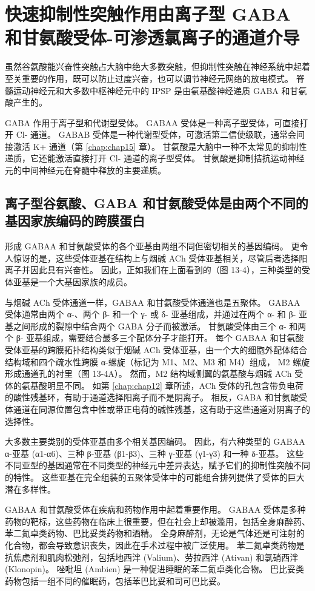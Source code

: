 \section{快速抑制性突触作用由离子型 GABA 和甘氨酸受体-可渗透氯离子的通道介导}

虽然谷氨酸能兴奋性突触占大脑中绝大多数突触，但抑制性突触在神经系统中起着至关重要的作用，既可以防止过度兴奋，也可以调节神经元网络的放电模式。
脊髓运动神经元和大多数中枢神经元中的 IPSP 是由氨基酸神经递质 GABA 和甘氨酸产生的。


GABA 作用于离子型和代谢型受体。 GABAA 受体是一种离子型受体，可直接打开 Cl- 通道。 
GABAB 受体是一种代谢型受体，可激活第二信使级联，通常会间接激活 K+ 通道（第 \ref{chap:chap15} 章）。 
甘氨酸是大脑中一种不太常见的抑制性递质，它还能激活直接打开 Cl- 通道的离子型受体。 
甘氨酸是抑制拮抗运动神经元的中间神经元在脊髓中释放的主要递质。


\subsection{离子型谷氨酸、GABA 和甘氨酸受体是由两个不同的基因家族编码的跨膜蛋白}
形成 GABAA 和甘氨酸受体的各个亚基由两组不同但密切相关的基因编码。 
更令人惊讶的是，这些受体亚基在结构上与烟碱 ACh 受体亚基相关，尽管后者选择阳离子并因此具有兴奋性。 
因此，正如我们在上面看到的（图 13-4），三种类型的受体亚基是一个大基因家族的成员。


与烟碱 ACh 受体通道一样，GABAA 和甘氨酸受体通道也是五聚体。
GABAA 受体通常由两个 α-、两个 β- 和一个 γ- 或 δ- 亚基组成，并通过在两个 α- 和 β- 亚基之间形成的裂隙中结合两个 GABA 分子而被激活。 甘氨酸受体由三个 α- 和两个 β- 亚基组成，需要结合最多三个配体分子才能打开。 
每个 GABAA 和甘氨酸受体亚基的跨膜拓扑结构类似于烟碱 ACh 受体亚基，由一个大的细胞外配体结合结构域和四个疏水性跨膜 α-螺旋（标记为 M1、M2、M3 和 M4）组成， M2 螺旋形成通道孔的衬里（图 13-4A）。 
然而，M2 结构域侧翼的氨基酸与烟碱 ACh 受体的氨基酸明显不同。 
如第 \ref{chap:chap12} 章所述，ACh 受体的孔包含带负电荷的酸性残基环，有助于通道选择阳离子而不是阴离子。 
相反，GABA 和甘氨酸受体通道在同源位置包含中性或带正电荷的碱性残基，这有助于这些通道对阴离子的选择性。


大多数主要类别的受体亚基由多个相关基因编码。 
因此，有六种类型的 GABAA α-亚基 (α1-α6)、三种 β-亚基 (β1-β3)、三种 γ-亚基 (γ1-γ3) 和一种 δ-亚基。 
这些不同亚型的基因通常在不同类型的神经元中差异表达，赋予它们的抑制性突触不同的特性。 
这些亚基在完全组装的五聚体受体中的可能组合排列提供了受体的巨大潜在多样性。


GABAA 和甘氨酸受体在疾病和药物作用中起着重要作用。 
GABAA 受体是多种药物的靶标，这些药物在临床上很重要，但在社会上却被滥用，包括全身麻醉药、苯二氮卓类药物、巴比妥类药物和酒精。 
全身麻醉剂，无论是气体还是可注射的化合物，都会导致意识丧失，因此在手术过程中被广泛使用。 
苯二氮卓类药物是抗焦虑剂和肌肉松弛剂，包括地西泮 (Valium)、劳拉西泮 (Ativan) 和氯硝西泮 (Klonopin)。 
唑吡坦 (Ambien) 是一种促进睡眠的苯二氮卓类化合物。 
巴比妥类药物包括一组不同的催眠药，包括苯巴比妥和司可巴比妥。


